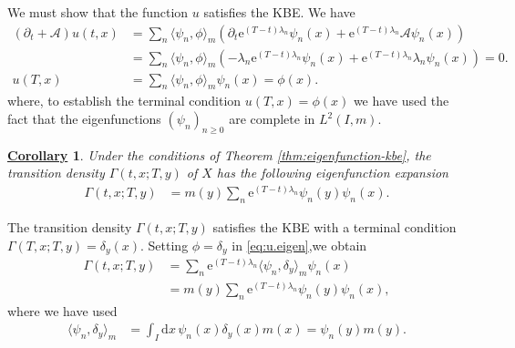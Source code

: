 \documentclass[12pt]{book}
\let\varphi\phi
\numberwithin{equation}{chapter}
\theoremstyle{plain}
\numberwithin{theorem}{section}
\newtheorem{corollary}[theorem]{\underline{Corollary}}
\theoremstyle{definition}
\numberwithin{exercise}{chapter}
\let\oldendproof\endproof
\renewenvironment{proof}[1][\proofname]{%
  \oldproof[\scshape\underline{#1}]%
}{\oldendproof}
\newcommand{\<}{\langle}
\renewcommand{\>}{\rangle}
\renewcommand{\(}{\left(}
\renewcommand{\)}{\right)}
\renewcommand{\[}{\left[}
\renewcommand{\]}{\right]}
\newcommand\Ac{\mathscr{A}}
\newcommand\Gam{\Gamma}
\newcommand\lam{\lambda}
\newcommand\del{\delta}
\renewcommand\d{\partial}
\newcommand\dd{\mathrm{d}}
\newcommand\ee{\mathrm{e}}
\begin{document}
\begin{proof}
We must show that the function $u$ satisfies the KBE.  We have
\begin{align}
(\d_t + \Ac) u(t,x)
	&=	\sum_n \< \psi_n, \varphi \>_m \( \d_t \ee^{(T-t)\lam_n} \psi_n(x)  + \ee^{(T-t)\lam_n} \Ac \psi_n(x) \) \\
	&=	\sum_n \< \psi_n, \varphi \>_m \( -\lam_n \ee^{(T-t)\lam_n} \psi_n(x)  + \ee^{(T-t)\lam_n} \lam_n \psi_n(x) \)
	=		0 . \\
u(T,x)
	&=	\sum_n \< \psi_n, \varphi \>_m \psi_n(x)
	=		\varphi(x) .
\end{align}
where, to establish the terminal condition $u(T,x) = \varphi(x)$ we have used the fact that the eigenfunctions $(\psi_n)_{n \geq 0}$ are complete in $L^2(I,m)$.
\end{proof}

\begin{corollary}
Under the conditions of Theorem \ref{thm:eigenfunction-kbe}, the transition density $\Gam(t,x;T,y)$ of $X$ has the following eigenfunction expansion
\begin{align}
\Gam(t,x;T,y)
	&=	m(y) \sum_n \ee^{(T-t)\lam_n} \psi_n(y) \psi_n(x) . \label{eq:Gamma.eigen}
\end{align}
\end{corollary}

\begin{proof}
The transition density $\Gam(t,x;T,y)$ satisfies the KBE with a terminal condition $\Gam(T,x;T,y) = \del_y(x)$.  Setting $\varphi = \del_y$ in \eqref{eq:u.eigen},we obtain
\begin{align}
\Gam(t,x;T,y)
	&=	\sum_n \ee^{(T-t)\lam_n} \< \psi_n, \del_y \>_m \psi_n(x) \\
	&=	m(y) \sum_n \ee^{(T-t)\lam_n} \psi_n(y) \psi_n(x) ,
\end{align}
where we have used
\begin{align}
\< \psi_n, \del_y \>_m
	&= \int_I \dd x \, \psi_n(x) \del_y(x) m(x)
	=		\psi_n(y) m(y) .
\end{align}
\end{proof}
\end{document}
